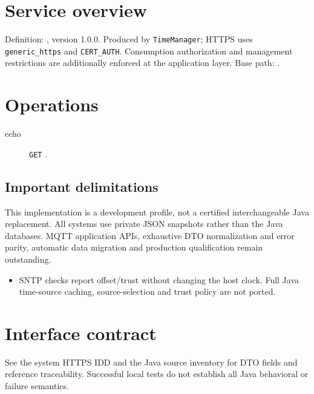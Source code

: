 \documentclass[a4paper]{arrowhead}
\begin{document}
\ArrowheadSetup
\section{Service overview}
Definition: , version 1.0.0. Produced by \texttt{TimeManager}; HTTPS uses \texttt{generic\_https} and \texttt{CERT\_AUTH}. Consumption authorization and management restrictions are additionally enforced at the application layer. Base path: .
\section{Operations}
\begin{description}
\item[echo] \texttt{GET} .
\end{description}
\subsection{Important delimitations}
This implementation is a development profile, not a certified interchangeable Java replacement. All systems use private JSON snapshots rather than the Java databases. MQTT application APIs, exhaustive DTO normalization and error parity, automatic data migration and production qualification remain outstanding.
\begin{itemize}
\item SNTP checks report offset/trust without changing the host clock. Full Java time-source caching, source-selection and trust policy are not ported.
\end{itemize}
\section{Interface contract}
See the system HTTPS IDD and the Java source inventory for DTO fields and reference traceability. Successful local tests do not establish all Java behavioral or failure semantics.
\end{document}
